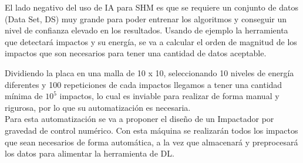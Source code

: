 El lado negativo del uso de IA para SHM es que se requiere un conjunto de datos (Data Set, DS) muy grande para poder entrenar los algoritmos y conseguir un nivel de confianza elevado en los resultados. Usando de ejemplo la herramienta que detectará impactos y su energía, se va a calcular el orden de magnitud de los impactos que son necesarios para tener una cantidad de datos aceptable.

Dividiendo la placa en una malla de 10 x 10, seleccionando 10 niveles de energía diferentes y 100 repeticiones de cada impactos llegamos a tener una cantidad mínima de $10^5$ impactos, lo cual es inviable para realizar de forma manual y rigurosa, por lo que su automatización es necesaria.\\

Para esta automatización se va a proponer el diseño de un Impactador por gravedad de control numérico. Con esta máquina se realizarán todos los impactos que sean necesarios de forma automática, a la vez que almacenará y preprocesará los datos para alimentar la herramienta de DL.
